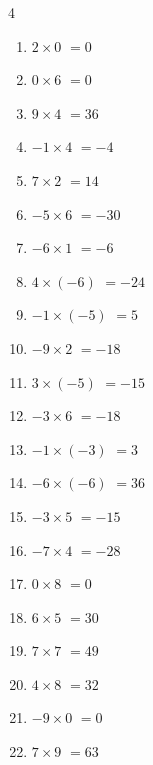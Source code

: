 \begin{multicols}{4}
\begin{enumerate}
  \item $2\times 0$
        $=0$

  \item $0\times 6$
        $=0$

  \item $9\times 4$
        $=36$

  \item $-1\times 4$
        $=-4$

  \item $7\times 2$
        $=14$

  \item $-5\times 6$
        $=-30$

  \item $-6\times 1$
        $=-6$

  \item $4\times (-6)$
        $=-24$

  \item $-1\times (-5)$
        $=5$

\columnbreak %

\resetques

  \item $-9\times 2$
        $=-18$

  \item $3\times (-5)$
        $=-15$

  \item $-3\times 6$
        $=-18$

  \item $-1\times (-3)$
        $=3$

  \item $-6\times (-6)$
        $=36$

  \item $-3\times 5$
        $=-15$

  \item $-7\times 4$
        $=-28$

  \item $0\times 8$
        $=0$

  \item $6\times 5$
        $=30$

  \item $7\times 7$
        $=49$

  \item $4\times 8$
        $=32$

  \item $-9\times 0$
        $=0$

  \item $7\times 9$
        $=63$


\end{enumerate}
\end{multicols}
